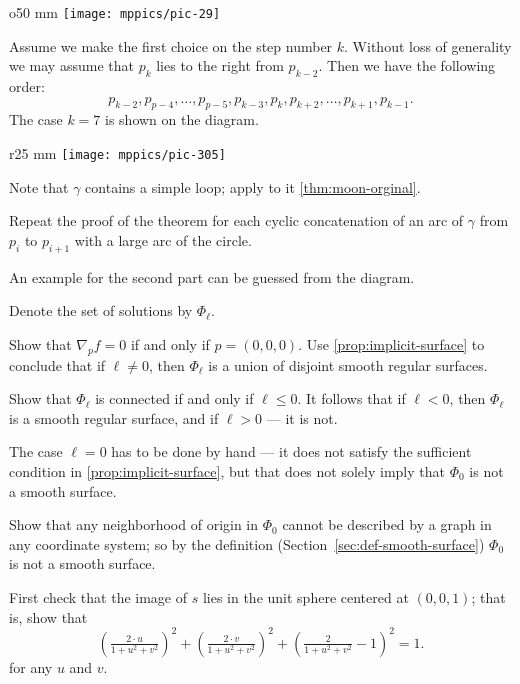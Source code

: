 {

\begin{wrapfigure}{o}{50 mm}
\vskip0mm
\centering
\texttt{[image: mppics/pic-29]}
\vskip0mm
\end{wrapfigure}

Assume we make the first choice on the step number $k$.
Without loss of generality we may assume that $p_k$ lies to the right from $p_{k-2}$.
Then we have the following order:
\[
p_{k-2},p_{p-4},\dots,p_{p-5},p_{k-3},p_k,p_{k+2},\dots,p_{k+1},p_{k-1}.
\]
The case $k=7$ is shown on the diagram.

}

\begin{wrapfigure}[7]{r}{25 mm}
\vskip-3mm
\centering
\texttt{[image: mppics/pic-305]}
\vskip0mm
\end{wrapfigure}

 Note that $\gamma$ contains a simple loop; apply to it \ref{thm:moon-orginal}.

Repeat the proof of the theorem for each cyclic concatenation of an arc of $\gamma$ from $p_i$ to $p_{i+1}$ with a large arc of the circle. 

An example for the second part can be guessed from the diagram.

\setcounter{eqtn}{0}

Denote the set of solutions by $\Phi_\ell$.

Show that $\nabla_p f=0$ if and only if $p=(0,0,0)$.
Use \ref{prop:implicit-surface} to conclude that if $\ell\ne 0$, then $\Phi_\ell$ is a union of disjoint smooth regular surfaces.

Show that $\Phi_\ell$ is connected if and only if $\ell\le 0$.
It follows that if $\ell<0$, then $\Phi_\ell$ is a smooth regular surface, and if $\ell>0$ --- it is not.

The case $\ell=0$ has to be done by hand --- it does not satisfy the sufficient condition in \ref{prop:implicit-surface}, but that does not solely imply that $\Phi_0$ is not a smooth surface.

Show that any neighborhood of origin in $\Phi_0$ cannot be described by a graph in any coordinate system;
so by the definition (Section~\ref{sec:def-smooth-surface}) $\Phi_0$ is not a smooth surface.

First check that the image of $s$ lies in the unit sphere centered at $(0,0,1)$;
that is, show that 
\[\left(\tfrac{2\cdot u}{1+u^2+v^2}\right)^2
+
\left(\tfrac{2\cdot v}{1+u^2+v^2}\right)^2
+\left(\tfrac{2}{1+u^2+v^2}-1\right)^2=1.\]
for any $u$ and $v$.

